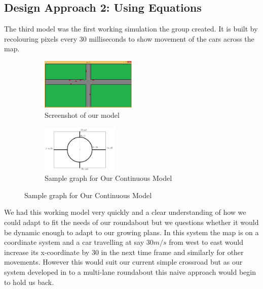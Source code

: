 \documentclass[11pt]{article}
\begin{document}
	
	\subsection{Design Approach 2: Using Equations}
	
    The third model was the first working simulation the group created. It is built by recolouring pixels every 30 milliseconds to show movement of the cars across the map. 
	
%		

\FloatBarrier
	\begin{figure}
	
		\centering
		\begin{subfigure}{.4\textwidth}
			\centering
		\includegraphics[width=0.5\textwidth]{ScreenShotNurSim}
		\caption{Screenshot of  our model }
		\end{subfigure}
		\begin{subfigure}{.5\textwidth}
			\centering
			\includegraphics[width=0.4\textwidth]{KimsModel}
			\caption{Sample graph for Our Continuous Model}
			\end{subfigure}
	\end{figure}
	
	We had this working model very quickly and a clear understanding of how we could adapt to fit the needs of our roundabout but we questions whether it would be dynamic enough to adapt to our growing plans. In this system the map is on a coordinate system and a car travelling at say $30 m/s$ from west to east would increase its x-coordinate by 30 in the next time frame and similarly for other movements. However this would suit our current simple crossroad but as our system developed in to a multi-lane roundabout this naive approach would begin to hold us back.
	
\end{document}
